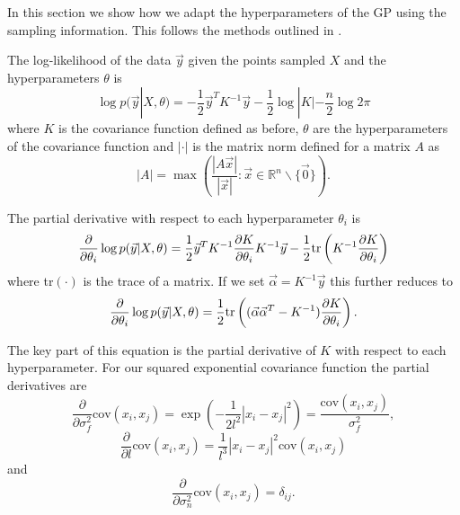 \documentclass[phd,tocprelim]{cornell}
\begin{document}
In this section we show how we adapt the hyperparameters of the GP using the sampling information. This follows the methods outlined in \cite{RW}.

The log-likelihood of the data $\vec{y}$ given the points sampled $X$ and the hyperparameters $\theta$ is
\begin{equation}
    \log p(\vec{y}|X, \theta) = -\frac{1}{2}\vec{y}^{T}K^{-1}\vec{y} - \frac{1}{2}\log|K| - \frac{n}{2} \log 2\pi
\end{equation}
where $K$ is the covariance function defined as before, $\theta$ are the hyperparameters of the covariance function and $|\cdot|$ is the matrix norm defined for a matrix $A$ as
\begin{equation}
    |A| = \max \left( \frac{|A\vec{x}|}{|\vec{x}|} : \vec{x} \in \mathbb{R}^{n}\backslash\{\vec{0}\} \right).
\end{equation}

The partial derivative with respect to each hyperparameter $\theta_{i}$ is
\begin{equation}
    \frac{\partial}{\partial \theta_{i}} \log p(\vec{y}|X,\theta) = \frac{1}{2}\vec{y}^{T}K^{-1}\frac{\partial K}{\partial \theta_{i}} K^{-1}\vec{y} - \frac{1}{2} {\rm tr}\left( K^{-1}\frac{\partial K}{\partial \theta_{i}} \right)
\end{equation}
where tr$(\cdot)$ is the trace of a matrix. If we set $\vec{\alpha} = K^{-1}\vec{y}$ this further reduces to
\begin{equation}
    \frac{\partial}{\partial \theta_{i}} \log p(\vec{y}|X,\theta) = \frac{1}{2} {\rm tr}\left((\vec{\alpha}\vec{\alpha}^{T} - K^{-1})\frac{\partial K}{\partial \theta_{i}}\right).
\end{equation}

The key part of this equation is the partial derivative of $K$ with respect to each hyperparameter. For our squared exponential covariance function the partial derivatives are
\begin{equation}
    \frac{\partial}{\partial \sigma_{f}^{2}} \mbox{cov}(x_{i}, x_{j}) = \exp\left( -\frac{1}{2l^{2}} |x_{i} - x_{j}|^{2}\right) = \frac{\mbox{cov}(x_{i}, x_{j})}{\sigma_{f}^{2}},
\end{equation}
\begin{equation}
    \frac{\partial}{\partial l} \mbox{cov}(x_{i}, x_{j}) = \frac{1}{l^{3}}|x_{i} - x_{j}|^{2}\mbox{cov}(x_{i}, x_{j})
\end{equation}
and
\begin{equation}
    \frac{\partial}{\partial \sigma_{n}^{2}} \mbox{cov}(x_{i}, x_{j}) = \delta_{ij}.
\end{equation}
\end{document}
